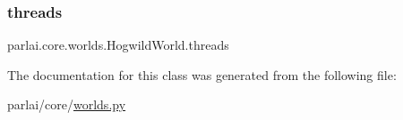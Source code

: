 \mbox{\label{classparlai_1_1core_1_1worlds_1_1HogwildWorld_a16d58ef1f8d81bae98e7f99e268ef9b4}} 
\subsubsection{\texorpdfstring{threads}{threads}}
{\footnotesize\ttfamily parlai.\+core.\+worlds.\+Hogwild\+World.\+threads}



The documentation for this class was generated from the following file\+:\begin{DoxyCompactItemize}
\item 
parlai/core/\hyperlink{parlai_2core_2worlds_8py}{worlds.\+py}\end{DoxyCompactItemize}
